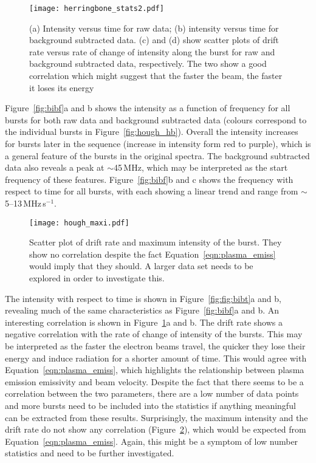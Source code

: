 %
%
\begin{figure}[t!]
\begin{center}
\texttt{[image: herringbone\_stats2.pdf]}
\caption[Hough transform herringbones]{(a) Intensity versus time for raw data; (b) intensity versus time for background subtracted data. (c) and (d) show scatter plots of drift rate versus rate of change of intensity along the burst for raw and background subtracted data, respectively.  The two show a good correlation which might suggest that the faster the beam, the faster it loses its energy}
\label{fig:bibt}
\end{center}
\end{figure}
Figure~\ref{fig:bibf}a and b shows the intensity as a function of frequency for all bursts for both raw data and background subtracted data (colours correspond to the individual bursts in Figure~\ref{fig:hough_hb}). Overall the intensity increases for bursts later in the sequence (increase in intensity form red to purple), which is a general feature of the bursts in the original spectra. The background subtracted data also reveals a peak at $\sim$45\,MHz, which may be interpreted as the start frequency of these features.
Figure~\ref{fig:bibf}b and c shows the frequency with respect to time for all bursts, with each showing a linear trend and range from $\sim$5--13\,MHz\,s$^{-1}$.
\begin{figure}[t!]
\begin{center}
\texttt{[image: hough\_maxi.pdf]}
\caption[Hough transform herringbones]{Scatter plot of drift rate and maximum intensity of the burst. They show no correlation despite the fact Equation~\ref{eqn:plasma_emiss} would imply that they should. A larger data set needs to be explored in order to investigate this.}
\label{fig:maxi}
\end{center}
\end{figure}
The intensity with respect to time is shown in Figure~\ref{fig:fig:bibt}a and b, revealing much of the same characteristics as Figure~\ref{fig:bibf}a and b. An interesting correlation is shown in Figure~\ref{fig:bibt}a and b. The drift rate shows a negative correlation with the rate of change of intensity of the bursts. This may be interpreted as the faster the electron beams travel, the quicker they lose their energy and induce radiation for a shorter amount of time. This would agree with Equation~\ref{eqn:plasma_emiss}, which highlights the relationship between plasma emission emissivity and beam velocity.  Despite the fact that there seems to be a correlation between the two parameters, there are a low number of data points and more bursts need to be included into the statistics if anything meaningful can be extracted from these results. Surprisingly, the maximum intensity and the drift rate do not show any correlation (Figure~\ref{fig:maxi}), which would be expected from Equation~\ref{eqn:plasma_emiss}. Again, this might be a symptom of low number statistics and need to be further investigated.
%
%

